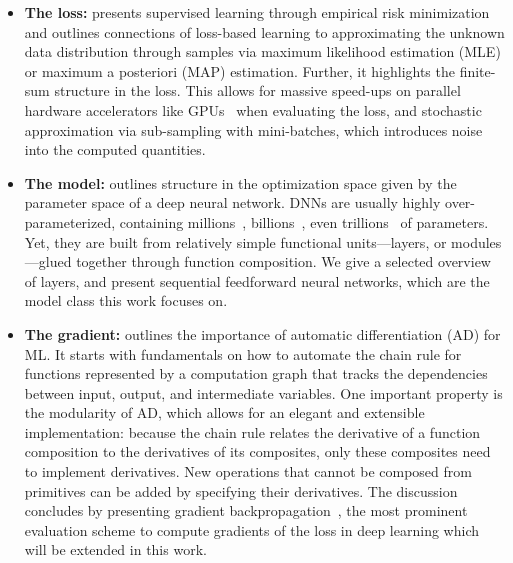 \begin{itemize}
\item \textbf{The loss:}  presents
  supervised learning through empirical risk minimization and outlines
  connections of loss-based learning to approximating the unknown data
  distribution through samples via maximum likelihood estimation (MLE) or
  maximum a posteriori (MAP) estimation. Further, it highlights the finite-sum
  structure in the loss. This allows for massive speed-ups on parallel hardware
  accelerators like GPUs~\cite{kirk2007nvidia} when evaluating the loss, and
  stochastic approximation via sub-sampling with mini-batches, which introduces
  noise into the computed quantities.

\item \textbf{The model:}  outlines
  structure in the optimization space given by the parameter space of a deep
  neural network. DNNs are usually highly over-parameterized, containing
  millions~\cite{krizhevsky2012imagenet,zeiler2012visualizing,simonyan2015deep,szegedy2015going,he2016deep},
  billions~\cite{radford2019language,brown2020language}, even
  trillions~\cite{fedus2022switch} of parameters. Yet, they are built from
  relatively simple functional units---layers, or modules---glued together
  through function composition. We give a selected overview of layers, and
  present sequential feedforward neural networks, which are the model class this
  work focuses on.

\item \textbf{The gradient:} 
  outlines the importance of automatic differentiation (AD) for ML. It starts
  with fundamentals on how to automate the chain rule for functions
  represented by a computation graph that tracks the dependencies between input,
  output, and intermediate variables. One important property is the modularity
  of AD, which allows for an elegant and extensible implementation: because the
  chain rule relates the derivative of a function composition to the derivatives
  of its composites, only these composites need to implement derivatives. New
  operations that cannot be composed from primitives can be added by specifying
  their derivatives. The discussion concludes by presenting gradient
  backpropagation~\cite{rumelhart1986learning}, the most prominent evaluation
  scheme to compute gradients of the loss in deep learning which will be
  extended in this work.
\end{itemize}

